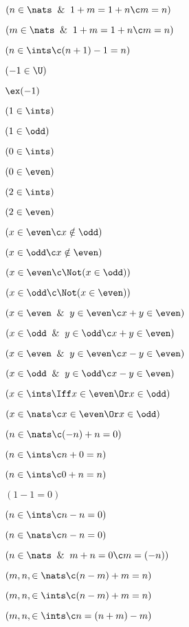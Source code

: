  $(n\in \nats \And 1+m=1+n\c m = n)$

 $(m\in \nats \And 1+m=1+n\c m = n)$

 $(n \in \ints \c (n+1) -1 = n)$

 $(-1 \in \U)$

 $\ex (-1)$ 

 $(1 \in \ints)$

 $(1 \in \odd)$

 $(0 \in \ints)$

 $(0 \in \even)$

 $(2 \in \ints)$

 $(2 \in \even)$

 $(x \in \even \c x \notin \odd)$

 $(x \in \odd \c x \notin \even)$

 $(x \in \even \c \Not(x \in \odd))$

 $(x \in \odd \c \Not(x \in \even))$

 $(x \in \even \And y \in \even \c x + y \in \even)$

 $(x \in \odd \And y \in \odd \c x + y \in \even)$

 $(x \in \even \And y \in \even \c x - y \in \even)$

 $(x \in \odd \And y \in \odd \c x - y \in \even)$

 $(x \in \ints \Iff x \in \even \Or x \in \odd)$

 $(x \in \nats \c x \in \even \Or x \in \odd)$

 $(n \in \nats \c (- n) +  n = 0)$

 $(n \in \ints \c n + 0 = n)$

 $(n \in \ints \c 0 + n = n)$

 $(1 - 1 = 0)$

 $(n\in\ints \c n - n = 0)$

 $(n\in\nats \c n - n = 0)$

 $(n \in \nats \And m + n = 0 \c m = (-n))$

 $(m,n,\in \nats \c (n - m) + m = n)$

 $(m,n,\in \ints \c (n - m) + m = n)$

 $(m,n,\in \ints \c n = (n + m)  - m )$

